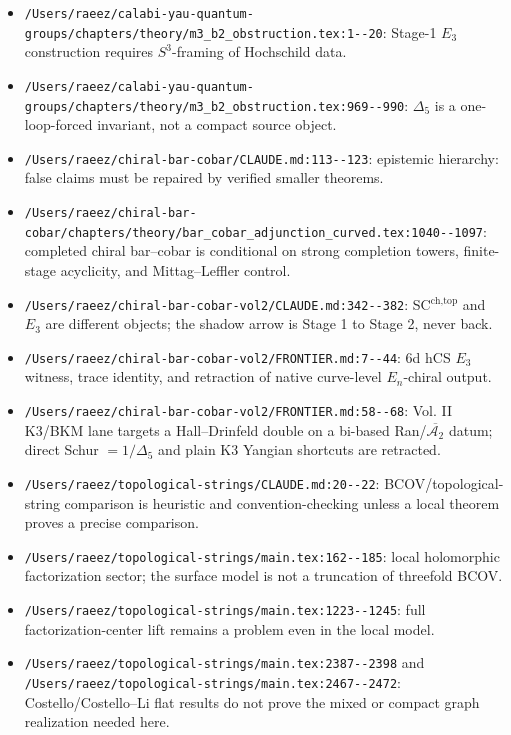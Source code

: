 \begin{itemize}
conditional beyond the formal root datum and product-level evidence.
\item \verb|/Users/raeez/calabi-yau-quantum-groups/chapters/theory/m3_b2_obstruction.tex:1--20|:
Stage-1 \(E_3\) construction requires \(S^3\)-framing of Hochschild data.
\item \verb|/Users/raeez/calabi-yau-quantum-groups/chapters/theory/m3_b2_obstruction.tex:969--990|:
\(\Delta_5\) is a one-loop-forced invariant, not a compact source object.
\item \verb|/Users/raeez/chiral-bar-cobar/CLAUDE.md:113--123|:
epistemic hierarchy: false claims must be repaired by verified smaller
theorems.
\item \verb|/Users/raeez/chiral-bar-cobar/chapters/theory/bar_cobar_adjunction_curved.tex:1040--1097|:
completed chiral bar--cobar is conditional on strong completion towers,
finite-stage acyclicity, and Mittag--Leffler control.
\item \verb|/Users/raeez/chiral-bar-cobar-vol2/CLAUDE.md:342--382|:
SC\({}^{\operatorname{ch,top}}\) and \(E_3\) are different objects; the
shadow arrow is Stage 1 to Stage 2, never back.
\item \verb|/Users/raeez/chiral-bar-cobar-vol2/FRONTIER.md:7--44|:
6d hCS \(E_3\) witness, trace identity, and retraction of native
curve-level \(E_n\)-chiral output.
\item \verb|/Users/raeez/chiral-bar-cobar-vol2/FRONTIER.md:58--68|:
Vol. II K3/BKM lane targets a Hall--Drinfeld double on a bi-based
Ran/\(\overline{\mathcal A_2}\) datum; direct Schur \(=1/\Delta_5\) and
plain K3 Yangian shortcuts are retracted.
\item \verb|/Users/raeez/topological-strings/CLAUDE.md:20--22|:
BCOV/topological-string comparison is heuristic and convention-checking
unless a local theorem proves a precise comparison.
\item \verb|/Users/raeez/topological-strings/main.tex:162--185|:
local holomorphic factorization sector; the surface model is not a
truncation of threefold BCOV.
\item \verb|/Users/raeez/topological-strings/main.tex:1223--1245|:
full factorization-center lift remains a problem even in the local model.
\item \verb|/Users/raeez/topological-strings/main.tex:2387--2398| and
\verb|/Users/raeez/topological-strings/main.tex:2467--2472|:
Costello/Costello--Li flat results do not prove the mixed or compact graph
realization needed here.
\end{itemize}

